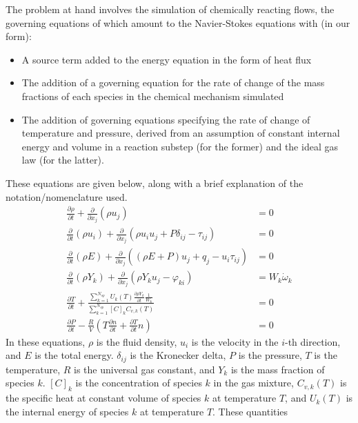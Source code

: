 The problem at hand involves the simulation of chemically reacting flows, the
governing equations of which amount to the Navier-Stokes equations with (in
our form):
\begin{itemize}
\item{A source term added to the energy equation in the form of heat flux}
\item{The addition of a governing equation for the rate of change of the
      mass fractions of each species in the chemical mechanism simulated}
\item{The addition of governing equations specifying the rate of change of
      temperature and pressure, derived from an assumption of constant
      internal energy and volume in a reaction substep (for the former)
      and the ideal gas law (for the latter).}
\end{itemize}
These equations are given below, along with a brief explanation of the notation/nomenclature
used.
\begin{align}
\frac{\partial \rho}{\partial t} + \frac{\partial}{\partial x_{j}}(\rho u_{j}) &= 0 \label{eq:consmass} \\
\frac{\partial}{\partial t}(\rho u_{i}) + \frac{\partial}{\partial x_{j}}(\rho u_{i} u_{j} + P\delta_{ij} - \tau_{ij}) &= 0 \label{eq:consmom} \\
\frac{\partial}{\partial t}(\rho E) + \frac{\partial}{\partial x_{j}}((\rho E + P)u_{j} + q_{j} - u_{i}\tau_{ij}) &= 0 \label{eq:conse} \\
\frac{\partial}{\partial t}(\rho Y_{k}) + \frac{\partial}{\partial x_{j}}(\rho Y_{k} u_{j} - \varphi_{ki}) &= W_{k}\dot{\omega}_{k} \label{eq:conssp}\\
\frac{\partial T}{\partial t} + \frac{\sum_{k=1}^{N_{sp}}U_{k}(T)\frac{\partial \rho Y_{k}}{\partial t}\frac{1}{W_{k}}}{\sum_{k=1}^{N_{sp}}[C]_{k}C_{v,k}(T)} &= 0 \label{eq:temp} \\
\frac{\partial P}{\partial t} - \frac{R}{V}(T\frac{\partial n}{\partial t} + \frac{\partial T}{\partial t}n) &= 0 \label{eq:pres}
\end{align}
In these equations, $\rho$ is the fluid density, $u_{i}$ is the velocity in the $i$-th direction, and $E$ is the total energy.
$\delta_{ij}$ is the Kronecker delta, $P$ is the pressure, $T$ is the temperature, $R$ is the universal gas constant, and $Y_{k}$ is the mass fraction of
species $k$. $[C]_{k}$ is the concentration of species $k$ in the gas mixture, $C_{v,k}(T)$ is the specific heat at constant volume
of species $k$ at temperature $T$, and $U_{k}(T)$ is the internal energy of species $k$ at temperature $T$. These quantities
